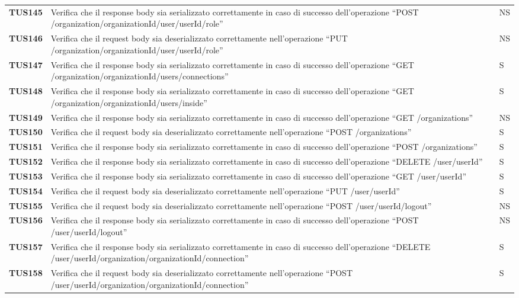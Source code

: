 \documentclass[../../piano-di-qualifica.tex]{subfiles}
\begin{document}
\begin{longtable}[H]{>{\centering\bfseries}m{3cm} >{}m{10cm} >{\centering\arraybackslash}m{3cm}}
  TUS145 & Verifica che il response body sia serializzato correttamente in caso di successo dell'operazione ``POST /organization/{organizationId}/user/{userId}/role'' & NS \\
  TUS146 & Verifica che il request body sia deserializzato correttamente nell'operazione ``PUT /organization/{organizationId}/user/{userId}/role'' & NS \\
  TUS147 & Verifica che il response body sia serializzato correttamente in caso di successo dell'operazione ``GET /organization/{organizationId}/users/connections'' & S \\
  TUS148 & Verifica che il response body sia serializzato correttamente in caso di successo dell'operazione ``GET /organization/{organizationId}/users/inside'' & S \\
  TUS149 & Verifica che il response body sia serializzato correttamente in caso di successo dell'operazione ``GET /organizations'' & NS \\
  TUS150 & Verifica che il request body sia deserializzato correttamente nell'operazione ``POST /organizations'' & S \\
  TUS151 & Verifica che il response body sia serializzato correttamente in caso di successo dell'operazione ``POST /organizations'' & S \\
  TUS152 & Verifica che il response body sia serializzato correttamente in caso di successo dell'operazione ``DELETE /user/{userId}'' & S \\
  TUS153 & Verifica che il response body sia serializzato correttamente in caso di successo dell'operazione ``GET /user/{userId}'' & S \\
  TUS154 & Verifica che il request body sia deserializzato correttamente nell'operazione ``PUT /user/{userId}'' & S \\
  TUS155 & Verifica che il request body sia deserializzato correttamente nell'operazione ``POST /user/{userId}/logout'' & NS \\
  TUS156 & Verifica che il response body sia serializzato correttamente in caso di successo dell'operazione ``POST /user/{userId}/logout'' & NS \\
  TUS157 & Verifica che il response body sia serializzato correttamente in caso di successo dell'operazione ``DELETE /user/{userId}/organization/{organizationId}/connection'' & S \\
  TUS158 & Verifica che il request body sia deserializzato correttamente nell'operazione ``POST /user/{userId}/organization/{organizationId}/connection'' & S \\

\end{longtable}
\end{document}
